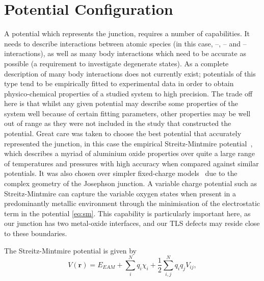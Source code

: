 \section{Potential Configuration}\label{sec:potential}

A potential which represents the junction, requires a number of capabilities.
It needs to describe interactions between atomic species (in this case, --, -- and -- interactions), as well as many body interactions which need to be accurate as possible (a requirement to investigate degenerate states).
As a complete description of many body interactions does not currently exist; potentials of this type tend to be empirically fitted to experimental data in order to obtain physico-chemical properties of a studied system to high precision.
The trade off here is that whilst any given potential may describe some properties of the system well because of certain fitting parameters, other properties may be well out of range as they were not included in the study that constructed the potential.
Great care was taken to choose the best potential that accurately represented the junction, in this case the empirical Streitz-Mintmire potential~\cite{Streitz1994}, which describes a myriad of aluminium oxide properties over quite a large range of temperatures and pressures with high accuracy when compared against similar potentials.
It was also chosen over simpler fixed-charge models~\cite{Catlow1982,Dienes1975} due to the complex geometry of the Josephson junction. A variable charge potential such as Streitz-Mintmire can capture the variable oxygen states when present in a predominantly metallic environment through the minimisation of the electrostatic term in the potential \cref{eq:sm}.
This capability is particularly important here, as our junction has two metal-oxide interfaces, and our TLS defects may reside close to these boundaries.

The Streitz-Mintmire potential is given by
\begin{equation}
V(\mathbf{r}) = E_{EAM}+\sum_{i}^{N}q_i\chi_i + \frac{1}{2}\sum_{i,j}^{N}q_{i}q_{j}V_{ij},\label{eq:sm}
\end{equation}

